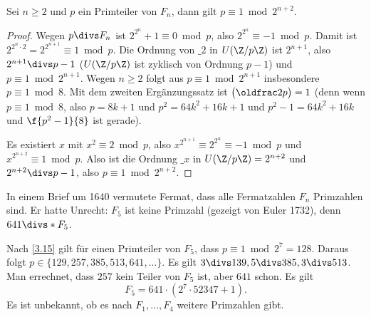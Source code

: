 \begin{st} \label{3.15}
	Sei $n \ge 2$ und $p$ ein Primteiler von $F_n$, dann gilt $p \equiv 1 \bmod 2^{n+2}$.
	\begin{proof}
		Wegen $p \divs F_n$ ist $2^{2^n} + 1 \equiv 0 \bmod p$, also $2^{2^n} \equiv - 1 \bmod p$.
		Damit ist $2^{2^n \cdot 2} = 2^{2^{n+1}} \equiv 1 \bmod p$.
		Die Ordnung von $\_ 2$ in $U(\Z / p\Z)$ ist $2^{n+1}$, also $2^{n+1} \divs p - 1$ ($U(\Z / p\Z)$ ist zyklisch von Ordnung $p-1$) und $p \equiv 1 \bmod 2^{n+1}$.
		Wegen $n \ge 2$ folgt aus $p \equiv 1 \bmod 2^{n+1}$ insbesondere $p \equiv 1 \bmod 8$.
		Mit dem zweiten Ergänzungssatz ist $\legsym{2}{p} = 1$ (denn wenn $p \equiv 1 \bmod 8$, also $p = 8k + 1$ und $p^2 = 64k^2 + 16k + 1$ und $p^2 - 1 = 64k^2 + 16k$ und $\f{p^2 - 1}{8}$ ist gerade).

		Es existiert $x$ mit $x^2 \equiv 2 \bmod p$, also $x^{2^{n+1}} \equiv 2^{2^n} \equiv -1 \bmod p$ und $x^{2^{n+2}} \equiv 1 \bmod p$.
		Also ist die Ordnung $\_ x$ in $U(\Z / p\Z) = 2^{n+2}$ und $2^{n+2} \divs p-1$, also $p \equiv 1 \bmod 2^{n+2}$.
	\end{proof}
\end{st}

\begin{nt} \label{3.16}
	In einem Brief um 1640 vermutete Fermat, dass alle Fermatzahlen $F_n$ Primzahlen sind.
	Er hatte Unrecht: $F_5$ ist keine Primzahl (gezeigt von Euler 1732), denn $641 \divs* F_5$.

	Nach \ref{3.15} gilt für einen Primteiler von $F_5$, dass $p \equiv 1 \bmod 2^7 = 128$.
	Daraus folgt $p \in \{129, 257, 385, 513, 641, \dotsc\}$.
	Es gilt $3 \divs 139, 5 \divs 385, 3 \divs 513$.
	Man errechnet, dass $257$ kein Teiler von $F_5$ ist, aber $641$ schon.
	Es gilt
	\[
		F_5 = 641 \cdot (2^7 \cdot 52347 + 1).
	\]
	Es ist unbekannt, ob es nach $F_1, \dotsc, F_4$ weitere Primzahlen gibt.
\end{nt}

